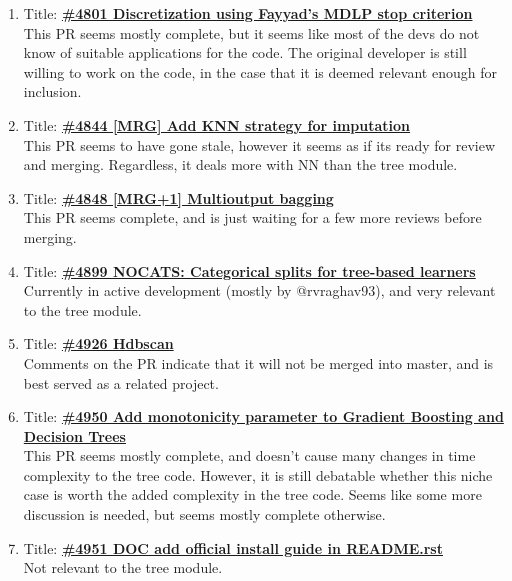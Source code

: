 \documentclass[12pt, oneside]{article}
\begin{document}
\begin{enumerate}
  \item
  Title:
  \textbf{\href{https://github.com/scikit-learn/scikit-learn/pull/4801}
    {\#4801 Discretization using Fayyad's MDLP stop criterion }}\\
  This PR seems mostly complete, but it seems like most of the devs do
  not know of suitable applications for the code. The original
  developer is still willing to work on the code, in the case that it
  is deemed relevant enough for inclusion.

  \item
  Title:
  \textbf{\href{https://github.com/scikit-learn/scikit-learn/pull/4844}
    {\#4844 [MRG] Add KNN strategy for imputation}}\\
  This PR seems to have gone stale, however it seems as if its ready
  for review and merging. Regardless, it deals more with NN than the
  tree module.

  \item
  Title:
  \textbf{\href{https://github.com/scikit-learn/scikit-learn/pull/4848}
    {\#4848 [MRG+1] Multioutput bagging}}\\
  This PR seems complete, and is just waiting for a few more reviews
  before merging.

  \item
  Title:
  \textbf{\href{https://github.com/scikit-learn/scikit-learn/pull/4899}
    {\#4899 NOCATS: Categorical splits for tree-based learners}}\\
  Currently in active development (mostly by @rvraghav93), and very 
  relevant to the tree module.

  \item
  Title:
  \textbf{\href{https://github.com/scikit-learn/scikit-learn/pull/4926}
    {\#4926 Hdbscan}}\\
  Comments on the PR indicate that it will not be merged into master,
  and is best served as a related project.

  \item
  Title:
  \textbf{\href{https://github.com/scikit-learn/scikit-learn/pull/4950}
    {\#4950 Add monotonicity parameter to Gradient Boosting and
      Decision Trees}}\\
  This PR seems mostly complete, and doesn't cause many changes in
  time complexity to the tree code. However, it is still debatable
  whether this niche case is worth the added complexity in the tree
  code. Seems like some more discussion is needed, but seems mostly
  complete otherwise.

  \item
  Title:
  \textbf{\href{https://github.com/scikit-learn/scikit-learn/pull/4951}
    {\#4951 DOC add official install guide in README.rst}}\\
  Not relevant to the tree module.


\end{enumerate}
\end{document}
